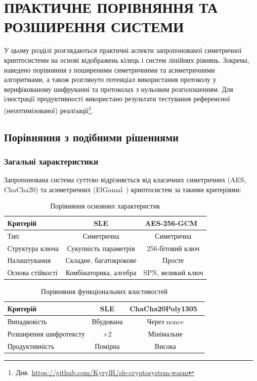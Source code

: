 \chapter{ПРАКТИЧНЕ ПОРІВНЯННЯ ТА РОЗШИРЕННЯ СИСТЕМИ}\label{ch:---:----}

У цьому розділі розглядаються практичні аспекти запропонованої симетричної криптосистеми на основі відображень кілець і систем лінійних рівнянь. Зокрема, наведено порівняння з поширеними симетричними та асиметричними алгоритмами, а також розглянуто потенціал використання протоколу у верифікованому шифруванні та протоколах з нульовим розголошенням. Для ілюстрації продуктивності використано результати тестування референсної (неоптимізованої) реалізації\footnote{Див. \url{https://github.com/KyrylR/sle-cryptosystem-wasm}}.

\section{Порівняння з подібними рішеннями}

\subsection{Загальні характеристики}

Запропонована система суттєво відрізняється від класичних симетричних (AES, ChaCha20) та асиметричних (ElGamal~\cite{elgamal}) криптосистем за такими критеріями:

\begin{table}[h!]
\centering
\begin{tabular}{|l|c|c|}
\hline
\textbf{Критерій} & \textbf{SLE} & \textbf{AES-256-GCM}~\cite{nist_gcm, rustcrypto_aes} \\
\hline
Тип & Симетрична & Симетрична \\
\hline
Структура ключа & Сукупність параметрів & 256-бітовий ключ \\
\hline
Налаштування & Складне, багатокрокове & Просте \\
\hline
Основа стійкості & Комбінаторика, алгебра & SPN, великий ключ \\
\hline
\end{tabular}
\caption{Порівняння основних характеристик}
\label{tab:table}
\end{table}

\begin{table}[h!]
\centering
\begin{tabular}{|l|c|c|}
\hline
\textbf{Критерій} & \textbf{SLE} & \textbf{ChaCha20Poly1305}~\cite{25, rustcrypto_chacha} \\
\hline
Випадковість & Вбудована & Через nonce \\
\hline
Розширення шифротексту & $\times 2$ & Мінімальне \\
\hline
Продуктивність & Помірна & Висока \\
\hline
\end{tabular}
\caption{Порівняння функціональних властивостей}
\label{tab:table2}
\end{table}

